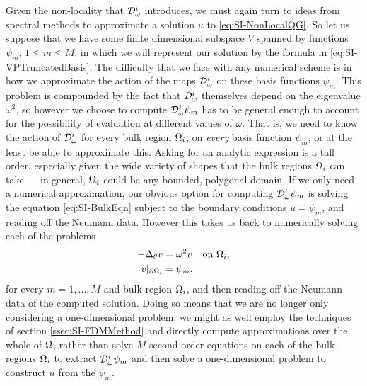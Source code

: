 Given the non-locality that $\mathcal{D}^i_\omega$ introduces, we must again turn to ideas from spectral methods to approximate a solution $u$ to \eqref{eq:SI-NonLocalQG}.
So let us suppose that we have some finite dimensional subspace $V$ spanned by functions $\psi_m$, $1\leq m\leq M$, in which we will represent our solution by the formula in \eqref{eq:SI-VPTruncatedBasis}.
The difficulty that we face with any numerical scheme is in how we approximate the action of the maps $\mathcal{D}^i_\omega$ on these basis functions $\psi_m$.
This problem is compounded by the fact that $\mathcal{D}^i_\omega$ themselves depend on the eigenvalue $\omega^2$, so however we choose to compute $\mathcal{D}^i_\omega \psi_m$ has to be general enough to account for the possibility of evaluation at different values of $\omega$.
That is, we need to know the action of $\mathcal{D}_{\omega}^i$ for every bulk region $\Omega_i$, on \emph{every} basis function $\psi_m$, or at the least be able to approximate this.
Asking for an analytic expression is a tall order, especially given the wide variety of shapes that the bulk regions $\Omega_i$ can take --- in general, $\Omega_i$ could be any bounded, polygonal domain.
If we only need a numerical approximation, our obvious option for computing $\mathcal{D}^i_\omega\psi_m$ is solving the equation \eqref{eq:SI-BulkEqn} subject to the boundary conditions $u=\psi_m$, and reading off the Neumann data.
However this takes us back to numerically solving each of the problems
\begin{align*}
	-\Delta_{\theta}v &= \omega^2 v &\text{on } \Omega_i, \\
	v\vert_{\partial\Omega_i} &= \psi_m,
\end{align*}
for every $m=1,...,M$ and bulk region $\Omega_i$, and then reading off the Neumann data of the computed solution.
Doing so means that we are no longer only considering a one-dimensional problem: we might as well employ the techniques of section \ref{ssec:SI-FDMMethod} and directly compute approximations over the whole of $\Omega$, rather than solve $M$ second-order equations on each of the bulk regions $\Omega_i$ to extract $\mathcal{D}^i_\omega\psi_m$ and then solve a one-dimensional problem to construct $u$ from the $\psi_m$.


